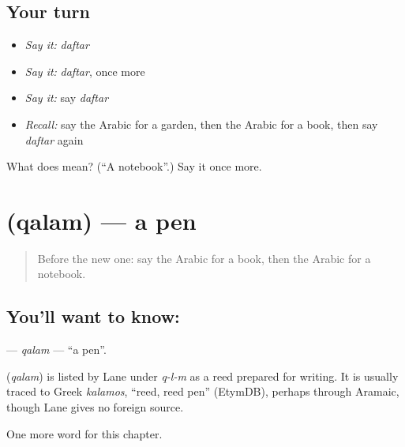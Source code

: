 \subsection*{Your turn}
\begin{itemize}
\raggedright
  \item \emph{Say it:} \emph{daftar}
  \item \emph{Say it:} \emph{daftar}, once more
  \item \emph{Say it:} say \emph{daftar}
  \item \emph{Recall:} say the Arabic for a garden, then the Arabic for a book, then say \emph{daftar} again
\end{itemize}

\begin{tcolorbox}[breakable,colback=teal!4,colframe=teal!35!black,title={Before you move on}]
What does  mean? (\textquotedblleft{}A notebook\textquotedblright{}.) Say it once more.
\end{tcolorbox}
\section[\texorpdfstring{\ar{قلم} (qalam)}{قلم (qalam)}]{ (qalam) — a pen}

\label{lesson:AR-C73-qalam}



\begin{quote}
Before the new one: say the Arabic for a book, then the Arabic for a notebook.
\end{quote}

\subsection*{You'll want to know: }
\textbf{} — \emph{qalam} — \textquotedblleft{}a pen\textquotedblright{}.

\begin{cousinweb}
\textbf{} (\emph{qalam}) is listed by Lane under \emph{q-l-m} as a reed prepared for writing. It is usually traced to Greek \emph{kalamos}, \textquotedblleft{}reed, reed pen\textquotedblright{} (EtymDB), perhaps through Aramaic, though Lane gives no foreign source.
\end{cousinweb}

\begin{grammarlens}[title={What you've built}]
One more word for this chapter.
\end{grammarlens}

